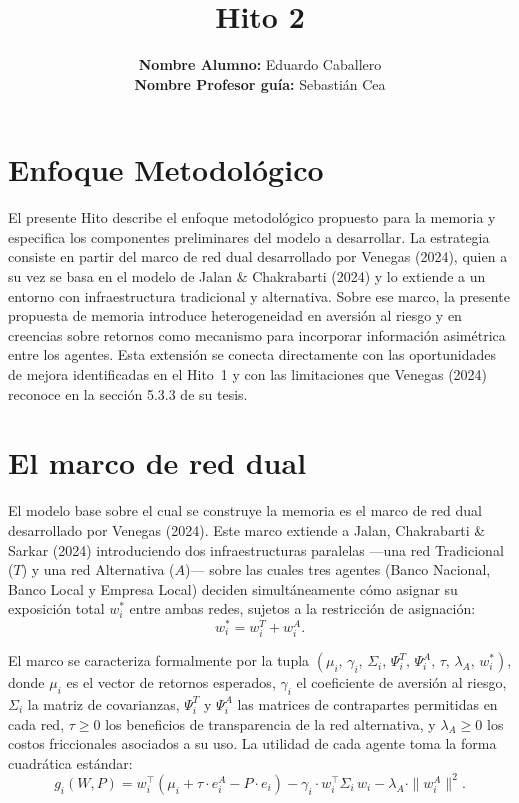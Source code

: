 \documentclass[12pt,a4paper]{article}
\title{\textbf{Hito 2}}
\author{
    \textbf{Nombre Alumno:} Eduardo Caballero \\
    \textbf{Nombre Profesor guía:} Sebastián Cea
}
\date{}
\begin{document}
\maketitle

\section*{Enfoque Metodológico}

El presente Hito describe el enfoque metodológico propuesto para la memoria y especifica los
componentes preliminares del modelo a desarrollar. La estrategia consiste en partir del marco
de red dual desarrollado por Venegas (2024), quien a su vez se basa en el modelo de Jalan \&
Chakrabarti (2024) y lo extiende a un entorno con infraestructura tradicional y alternativa.
Sobre ese marco, la presente propuesta de memoria introduce heterogeneidad en aversión al
riesgo y en creencias sobre retornos como mecanismo para incorporar información asimétrica
entre los agentes. Esta extensión se conecta directamente con las oportunidades de mejora
identificadas en el Hito~1 y con las limitaciones que Venegas (2024) reconoce en la sección
5.3.3 de su tesis.

\section{El marco de red dual}

El modelo base sobre el cual se construye la memoria es el marco de red dual desarrollado por
Venegas (2024). Este marco extiende a Jalan, Chakrabarti \& Sarkar (2024) introduciendo dos
infraestructuras paralelas —una red Tradicional ($T$) y una red Alternativa ($A$)— sobre las
cuales tres agentes (Banco Nacional, Banco Local y Empresa Local) deciden simultáneamente
cómo asignar su exposición total $w_i^*$ entre ambas redes, sujetos a la restricción de
asignación:
\begin{equation}
    w_i^* = w_i^T + w_i^A.
\end{equation}

El marco se caracteriza formalmente por la tupla $(\mu_i,\, \gamma_i,\, \Sigma_i,\, \Psi_i^T,\,
\Psi_i^A,\, \tau,\, \lambda_A,\, w_i^*)$, donde $\mu_i$ es el vector de retornos esperados,
$\gamma_i$ el coeficiente de aversión al riesgo, $\Sigma_i$ la matriz de covarianzas, $\Psi_i^T$
y $\Psi_i^A$ las matrices de contrapartes permitidas en cada red, $\tau \geq 0$ los beneficios
de transparencia de la red alternativa, y $\lambda_A \geq 0$ los costos friccionales asociados a
su uso. La utilidad de cada agente toma la forma cuadrática estándar:
\begin{equation}
    g_i(W, P) = w_i^\top(\mu_i + \tau \cdot e_i^A - P \cdot e_i)
    - \gamma_i \cdot w_i^\top \Sigma_i\, w_i
    - \lambda_A \cdot \|w_i^A\|^2.
    \label{eq:utilidad}
\end{equation}
\end{document}

